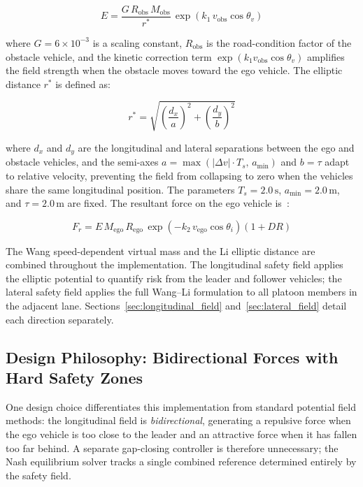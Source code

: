 \documentclass[12pt,a4paper,oneside]{report}
\begin{document}
\begin{equation}
E = \frac{G \, R_{\mathrm{obs}} \, M_{\mathrm{obs}}}{r^*} \, \exp\!\left(k_1 \, v_{\mathrm{obs}} \cos\theta_v\right)
\label{eq:li_field_strength}
\end{equation}

where $G = 6 \times 10^{-3}$ is a scaling constant, $R_{\mathrm{obs}}$ is the road-condition factor of the obstacle vehicle, and the kinetic correction term $\exp(k_1 v_{\mathrm{obs}} \cos\theta_v)$ amplifies the field strength when the obstacle moves toward the ego vehicle. The elliptic distance $r^*$ is defined as:

\begin{equation}
r^* = \sqrt{\left(\frac{d_x}{a}\right)^2 + \left(\frac{d_y}{b}\right)^2}
\label{eq:elliptic_distance}
\end{equation}

where $d_x$ and $d_y$ are the longitudinal and lateral separations between the ego and obstacle vehicles, and the semi-axes $a = \max(|\Delta v| \cdot T_s,\, a_{\min})$ and $b = \tau$ adapt to relative velocity, preventing the field from collapsing to zero when the vehicles share the same longitudinal position. The parameters $T_s = 2.0\,\mathrm{s}$, $a_{\min} = 2.0\,\mathrm{m}$, and $\tau = 2.0\,\mathrm{m}$ are fixed. The resultant force on the ego vehicle is~\cite{liSharedControlNovel2019}:

\begin{equation}
F_r = E \, M_{\mathrm{ego}} \, R_{\mathrm{ego}} \, \exp\!\left(-k_2 \, v_{\mathrm{ego}} \cos\theta_i\right)\left(1 + DR\right)
\label{eq:li_force}
\end{equation}

The Wang speed-dependent virtual mass and the Li elliptic distance are combined throughout the implementation. The longitudinal safety field applies the elliptic potential to quantify risk from the leader and follower vehicles; the lateral safety field applies the full Wang--Li formulation to all platoon members in the adjacent lane. Sections~\ref{sec:longitudinal_field} and~\ref{sec:lateral_field} detail each direction separately.

\subsection{Design Philosophy: Bidirectional Forces with Hard Safety Zones}

One design choice differentiates this implementation from standard potential field methods: the longitudinal field is \textit{bidirectional}, generating a repulsive force when the ego vehicle is too close to the leader and an attractive force when it has fallen too far behind. A separate gap-closing controller is therefore unnecessary; the Nash equilibrium solver tracks a single combined reference determined entirely by the safety field.
\end{document}
